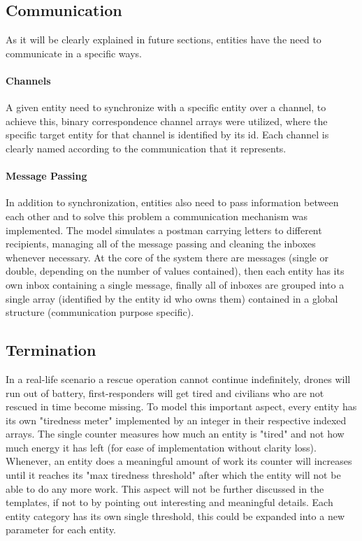 \subsection{Communication}
As it will be clearly explained in future sections, entities have the need to communicate in a specific ways.
\paragraph{Channels}
A given entity need to synchronize with a specific entity over a channel, to achieve this, binary correspondence channel arrays were utilized, where the specific target entity for that channel is identified by its id. Each channel is clearly named according to the communication that it represents.
\paragraph{Message Passing}
In addition to synchronization, entities also need to pass information between each other and to solve this problem a communication mechanism was implemented. The model simulates a postman carrying letters to different recipients, managing all of the message passing and cleaning the inboxes whenever necessary. At the core of the system there are messages (single or double, depending on the number of values contained), then each entity has its own inbox containing a single message, finally all of inboxes are grouped into a single array (identified by the entity id who owns them) contained in a global structure (communication purpose specific). 


\subsection{Termination}
\label{sec:term}
In a real-life scenario a rescue operation cannot continue indefinitely, drones will run out of battery, first-responders will get tired and civilians who are not rescued in time become missing. To model this important aspect, every entity has its own "tiredness meter" implemented by an integer in their respective indexed arrays. The single counter measures how much an entity is "tired" and not how much energy it has left (for ease of implementation without clarity loss). Whenever, an entity does a meaningful amount of work its counter will increases until it reaches its "max tiredness threshold" after which the entity will not be able to do any more work. This aspect will not be further discussed in the templates, if not to by pointing out interesting and meaningful details. Each entity category has its own single threshold, this could be expanded into a new parameter for each entity.


